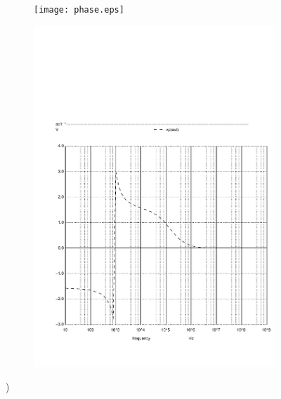 \begin{figure}[h]
  \centering
  \begin{subfigure}{0.5\textwidth}
      \texttt{[image: phase.eps]}
      \label{fig:output1}
  \end{subfigure}
  \begin{subfigure}{0.4\textwidth}
      \includegraphics[width=\linewidth, clip]{phase.pdf}
      \label{fig:output2}
  \end{subfigure}
  \caption{\small  )}
  \label{output_deviation}
\end{figure}


